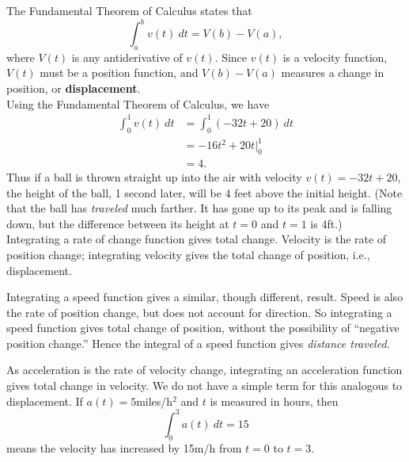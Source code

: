 The Fundamental Theorem of Calculus states that
$$\int_a^b v(t)\ dt = V(b) - V(a),$$ where $V(t)$ is any antiderivative of $v(t)$. Since $v(t)$ is a velocity function, $V(t)$ must be a position function, and $V(b) - V(a)$ measures a change in position, or \textbf{displacement}.\\

{Using the Fundamental Theorem of Calculus, we have 
\begin{align*}
\int_0^1 v(t)\ dt &= \int_0^1 (-32t+20)\ dt \\
			&= -16t^2 + 20t\Big|_0^1 \\
			&= 4.
\end{align*}
Thus if a ball is thrown straight up into the air with velocity $v(t) = -32t+20$, the height of the ball, 1 second later, will be 4 feet above the initial height. (Note that the ball has \textit{traveled} much farther. It has gone up to its peak and is falling down, but the difference between its height at $t=0$ and $t=1$ is 4ft.)
}\\

Integrating a rate of change function gives total change. Velocity is the rate of position change; integrating velocity gives the total change of position, i.e., displacement.

Integrating a speed function gives a similar, though different, result. Speed is also the rate of position change, but does not account for direction. So integrating a speed function gives total change of position, without the possibility of ``negative position change.'' Hence the integral of a speed function gives \textit{distance traveled.}


As acceleration is the rate of velocity change, integrating an acceleration function gives total change in velocity. We do not have a simple term for this analogous to displacement. If $a(t) = 5$miles/h$^2$ and $t$ is measured in hours, then 
$$\int_0^3 a(t)\ dt = 15$$
means the velocity has increased by 15m/h from $t=0$ to $t=3$.
\\

